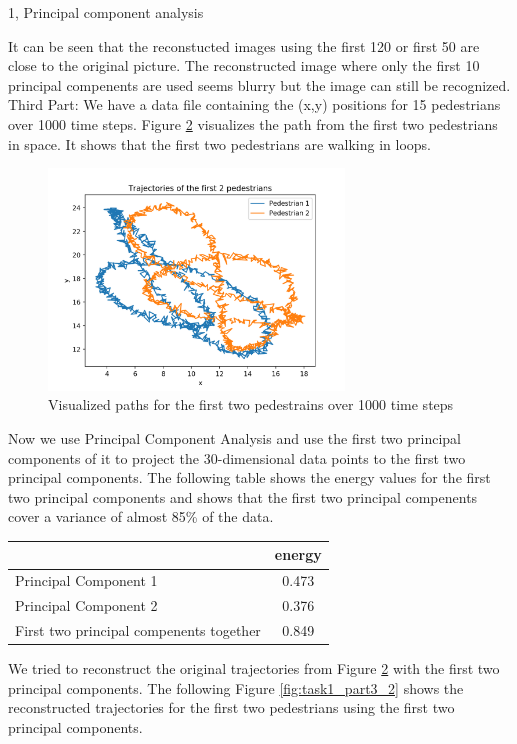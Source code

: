 \documentclass[10pt,a4paper]{article}
\begin{document}
\begin{task}{1, Principal component analysis}
\begin{figure}[H]
\label{fig:task1_part2}
\end{figure}
It can be seen that the reconstucted images using the first 120 or first 50 are close to the original picture. The reconstructed image where only the first 10 principal compenents are used seems blurry but the image can still be recognized.
\bigbreak
Third Part: We have a data file containing the (x,y) positions for 15 pedestrians over 1000 time steps. Figure \ref{fig:task1_part3_1} visualizes the path from the first two pedestrians in space. It shows that the first two pedestrians are walking in loops.
\begin{figure}[H]
\centering
\includegraphics[width=0.7\textwidth]{../plots/task1/task1_3.png}
\caption{Visualized paths for the first two pedestrains over 1000 time steps}
\label{fig:task1_part3_1}
\end{figure}
Now we use Principal Component Analysis and use the first two principal components of it to project the 30-dimensional data points to the first two principal components. The following table shows the energy values for the  first two principal components and shows that the first two principal compenents cover a variance of almost 85\% of the data.
\begin{center}
\begin{tabular}{l|c}
& energy\\
\hline
Principal Component 1& 0.473\\
Principal Component 2& 0.376\\
First two  principal compenents together&0.849\\
\hline
\end{tabular}
\end{center}
We tried to reconstruct the original trajectories from Figure \ref{fig:task1_part3_1} with the first two principal components.
The following Figure \ref{fig:task1_part3_2} shows the reconstructed trajectories for the first two pedestrians using the first two principal components.

\end{task}
\end{document}
